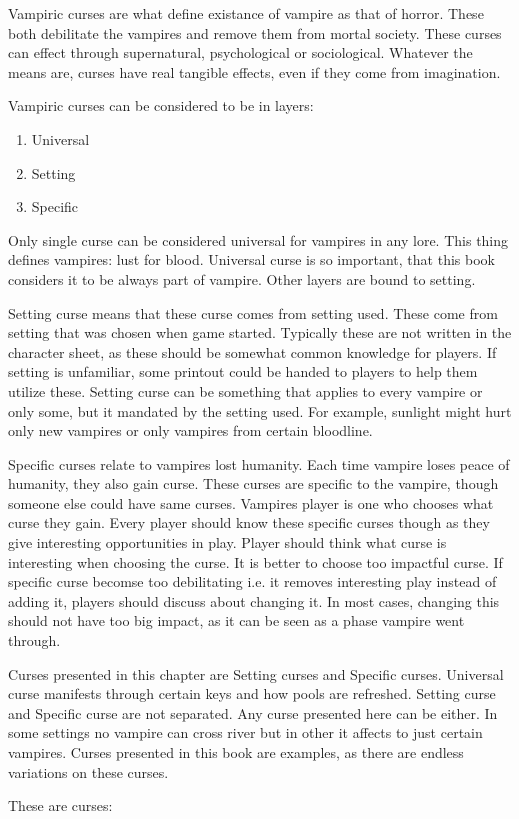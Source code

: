 
Vampiric curses are what define existance of vampire as that of horror.
These both debilitate the vampires and remove them from mortal society.
These curses can effect through supernatural, psychological or sociological.
Whatever the means are, curses have real tangible effects, even if they come from imagination.

Vampiric curses can be considered to be in layers:
\begin{enumerate}
\item{Universal} 
\item{Setting}
\item{Specific}
\end{enumerate}

Only single curse can be considered universal for vampires in any lore.
This thing defines vampires: lust for blood.
Universal curse is so important, that this book considers it to be always part of vampire.
Other layers are bound to setting.

Setting curse means that these curse comes from setting used.
These come from setting that was chosen when game started.
Typically these are not written in the character sheet, as these should be somewhat common knowledge for players.
If setting is unfamiliar, some printout could be handed to players to help them utilize these. %
Setting curse can be something that applies to every vampire or only some, but it mandated by the setting used.
For example, sunlight might hurt only new vampires or only vampires from certain bloodline.

Specific curses relate to vampires lost humanity.
Each time vampire loses peace of humanity, they also gain curse.
These curses are specific to the vampire, though someone else could have same curses.
Vampires player is one who chooses what curse they gain.
Every player should know these specific curses though as they give interesting opportunities in play.
Player should think what curse is interesting when choosing the curse.
It is better to choose too impactful curse.
If specific curse becomse too debilitating i.e. it removes interesting play instead of adding it, players should discuss about changing it.
In most cases, changing this should not have too big impact, as it can be seen as a phase vampire went through.

Curses presented in this chapter are Setting curses and Specific curses.
Universal curse manifests through certain keys and how pools are refreshed.
Setting curse and Specific curse are not separated.
Any curse presented here can be either.
In some settings no vampire can cross river but in other it affects to just certain vampires.
Curses presented in this book are examples, as there are endless variations on these curses.

These are curses:

\cols{
\CurseSecret{}
}
